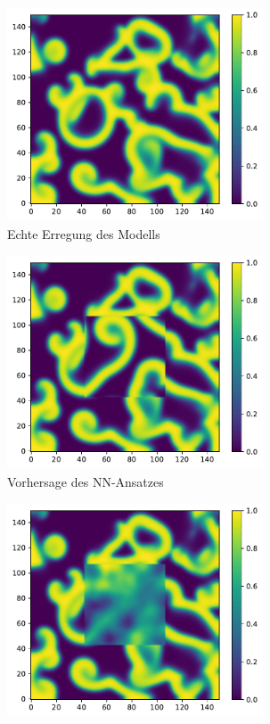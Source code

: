 \begin{figure}[h]
	\centering
	\begin{subfigure}{.5\textwidth}
		\centering
		\includegraphics[height=2.5in]{figures/results/inner_cross_prediction/barkley_u_inner_original.pdf}
		\setcapmargin[1cm]{0.5cm}
		\caption{Echte Erregung des Modells}
		\label{fig:exp_inner_cross_barkley_result_orig}
	\end{subfigure}%
	\begin{subfigure}{.5\textwidth}
		\centering
		\includegraphics[height=2.5in]{figures/results/inner_cross_prediction/barkley_u_inner_nn.pdf}
		\setcapmargin[1cm]{0.5cm}
  		\caption{Vorhersage des \textsc{NN}-Ansatzes}
  		\label{fig:exp_inner_cross_barkley_result_nn_pred}
	\end{subfigure}
	\begin{subfigure}{.5\textwidth}
		\centering
		\includegraphics[height=2.5in]{figures/results/inner_cross_prediction/barkley_u_inner_rbf.pdf}

\end{subfigure}
\end{figure}
